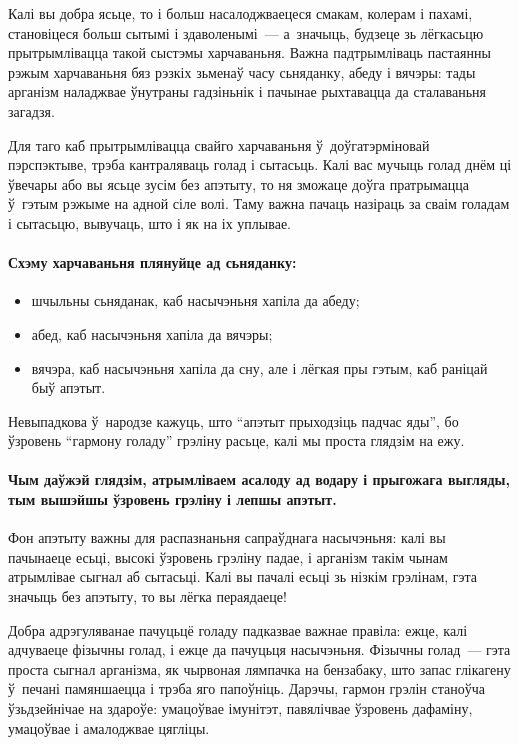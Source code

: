 Калі вы добра ясьце, то і больш насалоджваецеся смакам, колерам і пахамі, становіцеся больш сытымі і здаволенымі~--- а~значыць, будзеце зь лёгкасьцю прытрымлівацца такой сыстэмы харчаваньня. Важна падтрымліваць пастаянны рэжым харчаваньня бяз рэзкіх зьменаў часу сьняданку, абеду і вячэры: тады арганізм наладжвае ўнутраны гадзіньнік і пачынае рыхтавацца да сталаваньня загадзя. 


Для таго каб прытрымлівацца свайго харчаваньня ў~доўгатэрміновай пэрспэктыве, трэба кантраляваць голад і сытасьць. Калі вас мучыць голад днём ці ўвечары або вы ясьце зусім без апэтыту, то ня зможаце доўга пратрымацца ў~гэтым рэжыме на адной сіле волі. Таму важна пачаць назіраць за сваім голадам і сытасьцю, вывучаць, што і як на іх уплывае.

\paragraph{Схэму харчаваньня плянуйце ад сьняданку:}
\begin{itemize}
  \item шчыльны сьняданак, каб насычэньня хапіла да абеду;
  \item абед, каб насычэньня хапіла да вячэры;
  \item вячэра, каб насычэньня хапіла да сну, але і лёгкая пры гэтым, каб раніцай быў апэтыт.
\end{itemize}

Невыпадкова ў~народзе кажуць, што ``апэтыт прыходзіць падчас яды'', бо ўзровень ``гармону голаду'' грэліну расьце, калі мы проста глядзім на ежу. 

\paragraph{Чым даўжэй глядзім, атрымліваем асалоду ад водару і прыгожага выгляды, тым вышэйшы ўзровень грэліну і лепшы апэтыт.} Фон апэтыту важны для распазнаньня сапраўднага насычэньня: калі вы пачынаеце есьці, высокі ўзровень грэліну падае, і арганізм такім чынам атрымлівае сыгнал аб сытасьці. Калі вы пачалі есьці зь нізкім грэлінам, гэта значыць без апэтыту, то вы лёгка пераядаеце!

Добра адрэгуляванае пачуцьцё голаду падказвае важнае правіла: ежце, калі адчуваеце фізычны голад, і ежце да пачуцьця насычэньня. Фізычны голад~--- гэта проста сыгнал арганізма, як чырвоная лямпачка на бензабаку, што запас глікагену ў~печані памяншаецца і трэба яго папоўніць. Дарэчы, гармон грэлін станоўча ўзьдзейнічае на здароўе: умацоўвае імунітэт, павялічвае ўзровень дафаміну, умацоўвае і амалоджвае цягліцы. 

